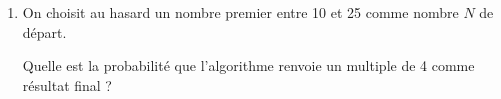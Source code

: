 \begin{enumerate}
\begin{enumerate}
		ligne 3 : si réponse $> \ldots$  alors
		\item Recopier la ligne 6 en complétant les pointillés:
		
		ligne 6 : dire \ldots $*(\ldots  + \ldots)$ pendant 2 secondes
	\end{enumerate}
\item On choisit au hasard un nombre premier entre 10 et 25 comme nombre $N$ de départ. 

Quelle est la probabilité que l'algorithme renvoie un multiple de 4 comme résultat final ?
\end{enumerate}

\bigskip

